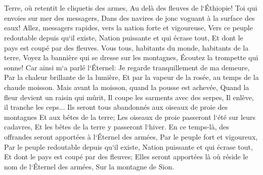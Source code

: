 \chapter{}

\verse Terre, où retentit le cliquetis des armes, Au delà des fleuves de l`Éthiopie! 
\verse Toi qui envoies sur mer des messagers, Dans des navires de jonc voguant à la surface des eaux! Allez, messagers rapides, vers la nation forte et vigoureuse, Vers ce peuple redoutable depuis qu`il existe, Nation puissante et qui écrase tout, Et dont le pays est coupé par des fleuves. 
\verse Vous tous, habitants du monde, habitants de la terre, Voyez la bannière qui se dresse sur les montagnes, Écoutez la trompette qui sonne! 
\verse Car ainsi m`a parlé l`Éternel: Je regarde tranquillement de ma demeure, Par la chaleur brillante de la lumière, Et par la vapeur de la rosée, au temps de la chaude moisson. 
\verse Mais avant la moisson, quand la pousse est achevée, Quand la fleur devient un raisin qui mûrit, Il coupe les sarments avec des serpes, Il enlève, il tranche les ceps... 
\verse Ils seront tous abandonnés aux oiseaux de proie des montagnes Et aux bêtes de la terre; Les oiseaux de proie passeront l`été sur leurs cadavres, Et les bêtes de la terre y passeront l`hiver. 
\verse En ce temps-là, des offrandes seront apportées à l`Éternel des armées, Par le peuple fort et vigoureux, Par le peuple redoutable depuis qu`il existe, Nation puissante et qui écrase tout, Et dont le pays est coupé par des fleuves; Elles seront apportées là où réside le nom de l`Éternel des armées, Sur la montagne de Sion. 

